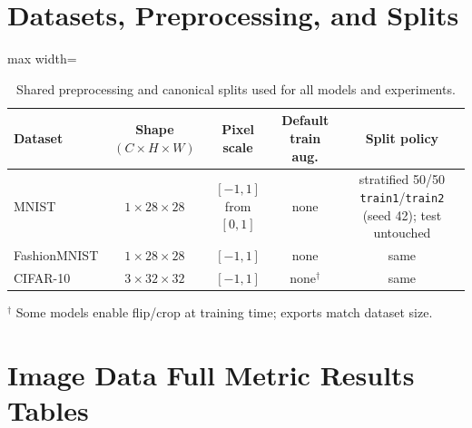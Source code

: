 \section{Datasets, Preprocessing, and Splits}
\label{app:image-data}
\begin{table}[H]
\centering
\scriptsize
\caption{Shared preprocessing and canonical splits used for all models and experiments.}
\label{tab:img-data-shared}
\begin{adjustbox}{max width=\linewidth}
\begin{tabular}{@{}lcccc@{}}
\toprule
Dataset & Shape $(C\times H\times W)$ & Pixel scale & Default train aug. & Split policy \\
\midrule
MNIST & $1\times28\times28$ & $[-1,1]$ from $[0,1]$ & none & stratified 50/50 \texttt{train1}/\texttt{train2} (seed 42); test untouched \\
FashionMNIST & $1\times28\times28$ & $[-1,1]$ & none & same \\
CIFAR-10 & $3\times32\times32$ & $[-1,1]$ & none$^\dagger$ & same \\
\bottomrule
\end{tabular}
\end{adjustbox}

\vspace{2pt}\footnotesize $^\dagger$ Some models enable flip/crop at training time; exports match dataset size.
\end{table}


\section{Image Data Full Metric Results Tables}
\label{app:image-results}

